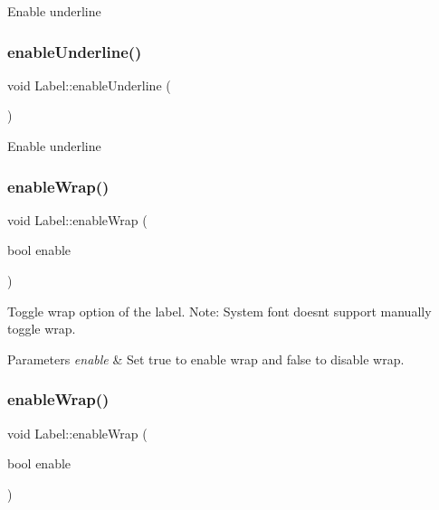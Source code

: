 Enable underline \mbox{\label{classLabel_af8dd37db2a2bf06ef6114ddbcb77845d}} 
\subsubsection{\texorpdfstring{enable\+Underline()}{enableUnderline()}\hspace{0.1cm}{\footnotesize\ttfamily [2/2]}}
{\footnotesize\ttfamily void Label\+::enable\+Underline (\begin{DoxyParamCaption}{ }\end{DoxyParamCaption})}

Enable underline \mbox{\label{classLabel_aff268f12033618164c424d7fd24bc94f}} 
\subsubsection{\texorpdfstring{enable\+Wrap()}{enableWrap()}\hspace{0.1cm}{\footnotesize\ttfamily [1/2]}}
{\footnotesize\ttfamily void Label\+::enable\+Wrap (\begin{DoxyParamCaption}\item[{bool}]{enable }\end{DoxyParamCaption})}

Toggle wrap option of the label. Note\+: System font doesn\textquotesingle{}t support manually toggle wrap.


\begin{DoxyParams}{Parameters}
{\em enable} & Set true to enable wrap and false to disable wrap. \\
\hline
\end{DoxyParams}
\mbox{\label{classLabel_aff268f12033618164c424d7fd24bc94f}} 
\subsubsection{\texorpdfstring{enable\+Wrap()}{enableWrap()}\hspace{0.1cm}{\footnotesize\ttfamily [2/2]}}
{\footnotesize\ttfamily void Label\+::enable\+Wrap (\begin{DoxyParamCaption}\item[{bool}]{enable }\end{DoxyParamCaption})}

